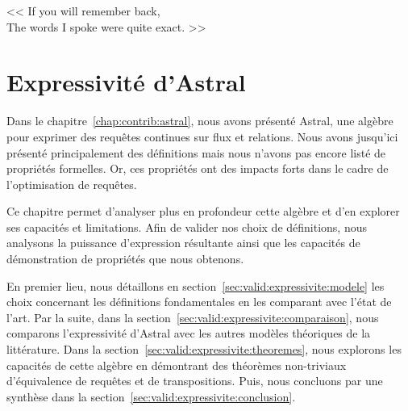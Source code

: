 \begin{savequote}[6cm]
<< If you will remember back,\\ The words I spoke were quite exact. >>
\end{savequote}

\chapter{Expressivité d'Astral}\label{chap:validation:expressivite}
\chaptertoc

Dans le chapitre~\ref{chap:contrib:astral}, nous avons présenté Astral, une algèbre pour exprimer des requêtes continues sur flux et relations. Nous avons jusqu'ici présenté principalement des définitions mais nous n'avons pas encore listé de propriétés formelles. Or, ces propriétés ont des impacts forts dans le cadre de l'optimisation de requêtes.

Ce chapitre permet d'analyser plus en profondeur cette algèbre et d'en explorer ses capacités et limitations. Afin de valider nos choix de définitions, nous analysons la puissance d'expression résultante ainsi que les capacités de démonstration de propriétés que nous obtenons.

En premier lieu, nous détaillons en section~\ref{sec:valid:expressivite:modele} les choix concernant les définitions fondamentales en les comparant avec l'état de l'art. Par la suite, dans la section~\ref{sec:valid:expressivite:comparaison}, nous comparons l'expressivité d'Astral avec les autres modèles théoriques de la littérature. Dans la section~\ref{sec:valid:expressivite:theoremes}, nous explorons les capacités de cette algèbre en démontrant des théorèmes non-triviaux d'équivalence de requêtes et de transpositions. Puis, nous concluons par une synthèse dans la section~\ref{sec:valid:expressivite:conclusion}.




